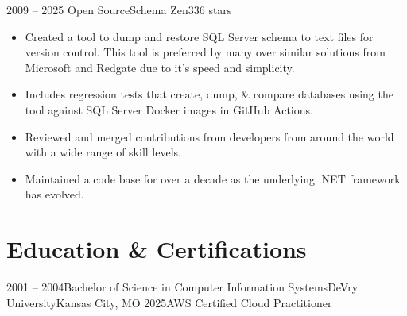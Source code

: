\documentclass[11pt,letterpaper,final]{moderncv}
\begin{document}
	\cventry
{2009 -- 2025 } {Open Source}{Schema Zen}{}{336 stars}{
		\begin{itemize}
			\item 
				Created a tool to dump and restore SQL Server schema to text
				files for version control. This tool is preferred by many over
				similar solutions from Microsoft and Redgate due to it's speed
				and simplicity.
			\item 
				Includes regression tests that create, dump, \& compare
				databases using the tool against SQL Server Docker images in
				GitHub Actions.
			\item 
				Reviewed and merged contributions from developers from around the world
				with a wide range of skill levels.
			\item 
				Maintained a code base for over a decade as the underlying .NET
				framework has evolved.
		\end{itemize}
}
\linebreak


\section{Education \& Certifications} 
	\cventry
{2001 -- 2004}{Bachelor of Science in Computer Information Systems}{DeVry University}{Kansas City, MO}{}{}
	\cventry
{2025}{AWS Certified Cloud Practitioner}{}{}{}{}
\end{document}
